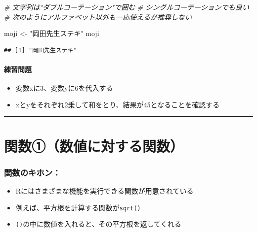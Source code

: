 \documentclass[
]{book}
\newenvironment{Shaded}{\begin{snugshade}}{\end{snugshade}}
\newcommand{\CommentTok}[1]{\textcolor[rgb]{0.56,0.35,0.01}{\textit{#1}}}
\newcommand{\NormalTok}[1]{#1}
\newcommand{\OtherTok}[1]{\textcolor[rgb]{0.56,0.35,0.01}{#1}}
\newcommand{\StringTok}[1]{\textcolor[rgb]{0.31,0.60,0.02}{#1}}
\providecommand{\tightlist}{%
  \setlength{\itemsep}{0pt}\setlength{\parskip}{0pt}}
\begin{document}
\begin{Shaded}
\begin{Highlighting}[]
\CommentTok{\# 文字列は"ダブルコーテーション"で囲む}
\CommentTok{\# \textquotesingle{}シングルコーテーション\textquotesingle{}でも良い}
\CommentTok{\# 次のようにアルファベット以外も一応使えるが推奨しない}

\NormalTok{moji }\OtherTok{\textless{}{-}} \StringTok{"岡田先生ステキ"}
\NormalTok{moji}
\end{Highlighting}
\end{Shaded}

\begin{verbatim}
## [1] "岡田先生ステキ"
\end{verbatim}

\hypertarget{ux7df4ux7fd2ux554fux984c}{%
\paragraph*{練習問題}\label{ux7df4ux7fd2ux554fux984c}}

\begin{itemize}
\tightlist
\item
  変数xに3、変数yに6を代入する
\item
  xとyをそれぞれ2乗して和をとり、結果が45となることを確認する
\end{itemize}

\begin{center}\rule{0.5\linewidth}{0.5pt}\end{center}

\hypertarget{ux95a2ux6570ux2460ux6570ux5024ux306bux5bfeux3059ux308bux95a2ux6570}{%
\section{関数①（数値に対する関数）}\label{ux95a2ux6570ux2460ux6570ux5024ux306bux5bfeux3059ux308bux95a2ux6570}}

\hypertarget{ux95a2ux6570ux306eux30adux30dbux30f3}{%
\subsubsection*{関数のキホン：}\label{ux95a2ux6570ux306eux30adux30dbux30f3}}

\begin{itemize}
\tightlist
\item
  Rにはさまざまな機能を実行できる関数が用意されている
\item
  例えば、平方根を計算する関数が\texttt{sqrt()}
\item
  \texttt{()}の中に数値を入れると、その平方根を返してくれる
\end{itemize}
\end{document}
